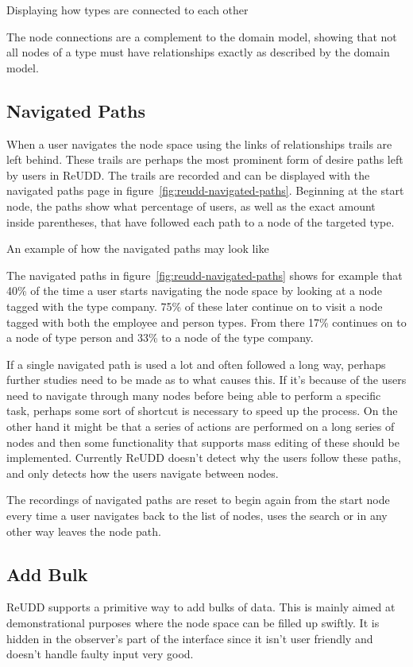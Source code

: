 \documentclass[a4paper]{report}
\begin{document}
	{Displaying how types are connected to each other}

The node connections are a complement to the domain model, showing that not all nodes of a type must have relationships exactly as described by the domain model.

\subsection{Navigated Paths}
When a user navigates the node space using the links of relationships trails are left behind. These trails are perhaps the most prominent form of desire paths left by users in ReUDD. The trails are recorded and can be displayed with the navigated paths page in figure~\ref{fig:reudd-navigated-paths}. Beginning at the start node, the paths show what percentage of users, as well as the exact amount inside parentheses, that have followed each path to a node of the targeted type.

	{An example of how the navigated paths may look like}

The navigated paths in figure~\ref{fig:reudd-navigated-paths} shows for example that 40\% of the time a user starts navigating the node space by looking at a node tagged with the type company. 75\% of these later continue on to visit a node tagged with both the employee and person types. From there 17\% continues on to a node of type person and 33\% to a node of the type company.

If a single navigated path is used a lot and often followed a long way, perhaps further studies need to be made as to what causes this. If it's because of the users need to navigate through many nodes before being able to perform a specific task, perhaps some sort of shortcut is necessary to speed up the process. On the other hand it might be that a series of actions are performed on a long series of nodes and then some functionality that supports mass editing of these should be implemented. Currently ReUDD doesn't detect why the users follow these paths, and only detects how the users navigate between nodes.

The recordings of navigated paths are reset to begin again from the start node every time a user navigates back to the list of nodes, uses the search or in any other way leaves the node path.

\subsection{Add Bulk}
ReUDD supports a primitive way to add bulks of data. This is mainly aimed at demonstrational purposes where the node space can be filled up swiftly. It is hidden in the observer's part of the interface since it isn't user friendly and doesn't handle faulty input very good.
\end{document}
